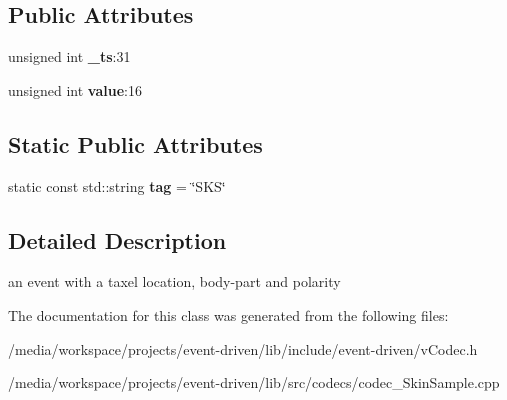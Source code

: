 \subsection*{Public Attributes}
\begin{DoxyCompactItemize}
\item 
\mbox{\label{classev_1_1SkinSample_ac1f3f8035d23ba4450b1e852f3422825}} 
unsigned int {\bfseries \+\_\+ts}\+:31
\item 
\mbox{\label{classev_1_1SkinSample_a23534f3787cad7c9d1c8c2ba8bf5bbf4}} 
unsigned int {\bfseries value}\+:16
\end{DoxyCompactItemize}
\subsection*{Static Public Attributes}
\begin{DoxyCompactItemize}
\item 
\mbox{\label{classev_1_1SkinSample_a40d0036de84cc8071b85157fccb2db54}} 
static const std\+::string {\bfseries tag} = \char`\"{}S\+KS\char`\"{}
\end{DoxyCompactItemize}


\subsection{Detailed Description}
an event with a taxel location, body-\/part and polarity 

The documentation for this class was generated from the following files\+:\begin{DoxyCompactItemize}
\item 
/media/workspace/projects/event-\/driven/lib/include/event-\/driven/v\+Codec.\+h\item 
/media/workspace/projects/event-\/driven/lib/src/codecs/codec\+\_\+\+Skin\+Sample.\+cpp\end{DoxyCompactItemize}
